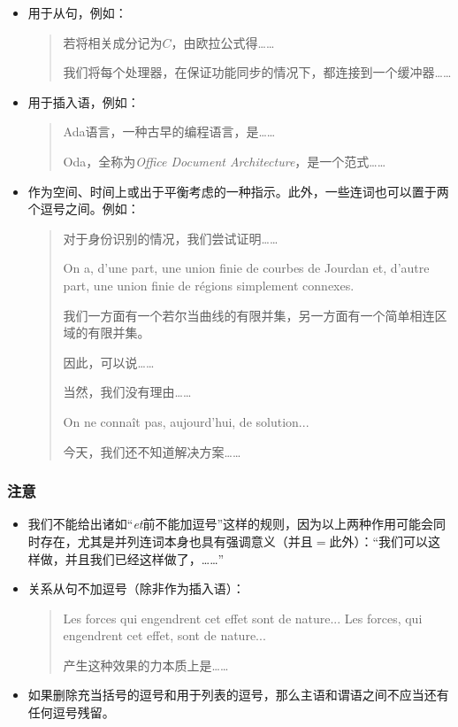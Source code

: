 \begin{itemize}
    \item 用于从句，例如：
    \begin{quote}
        若将相关成分记为$C$，由欧拉公式得……

        我们将每个处理器，在保证功能同步的情况下，都连接到一个缓冲器……
    \end{quote}
    \item 用于插入语，例如：
    \begin{quote}
        Ada语言，一种古早的编程语言，是……

        Oda，全称为\emph{Office Document Architecture}，是一个范式……
    \end{quote}
    \item 作为空间、时间上或出于平衡考虑的一种指示。此外，一些连词也可以置于两个逗号之间。例如：
    \begin{quote}
        对于身份识别的情况，我们尝试证明……

        On a, d'une part, une union finie de courbes de Jourdan et, d'autre part, une union finie de régions simplement connexes.
        \begin{bil}
            我们一方面有一个若尔当曲线的有限并集，另一方面有一个简单相连区域的有限并集。
        \end{bil}

        因此，可以说……

        当然，我们没有理由……

        On ne connaît pas, aujourd'hui, de solution...
        \begin{bil}
            今天，我们还不知道解决方案……
        \end{bil}
    \end{quote}
\end{itemize}

\subsubsection{注意}

\begin{itemize}
    \item 我们不能给出诸如``\emph{et}前不能加逗号''这样的规则，因为以上两种作用可能会同时存在，尤其是并列连词本身也具有强调意义（并且$=$此外）：``我们可以这样做，并且我们已经这样做了，……''
    \item 关系从句不加逗号（除非作为插入语）：
    \begin{quote}
        Les forces qui engendrent cet effet sont de nature...
        Les forces, qui engendrent cet effet, sont de nature...
        \begin{bil}
            产生这种效果的力本质上是……
        \end{bil}
    \end{quote}
    \item 如果删除充当括号的逗号和用于列表的逗号，那么主语和谓语之间不应当还有任何逗号残留。
\end{itemize}

